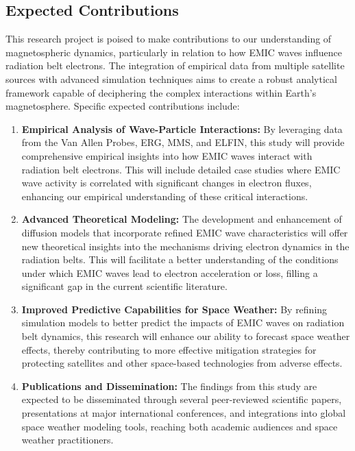 \documentclass[
  letterpaper,
  DIV=11,
  numbers=noendperiod]{scrartcl}
\begin{document}
\subsection{Expected Contributions}\label{expected-contributions}

This research project is poised to make contributions to our understanding of magnetospheric dynamics, particularly in relation to how EMIC waves influence radiation belt electrons. The integration of empirical data from multiple satellite sources with advanced simulation techniques aims to create a robust analytical framework capable of deciphering the complex interactions within Earth's magnetosphere. Specific expected contributions include:

\begin{enumerate}
\def\labelenumi{\arabic{enumi}.}
\item
  \textbf{Empirical Analysis of Wave-Particle Interactions:} By leveraging data from the Van Allen Probes, ERG, MMS, and ELFIN, this study will provide comprehensive empirical insights into how EMIC waves interact with radiation belt electrons. This will include detailed case studies where EMIC wave activity is correlated with significant changes in electron fluxes, enhancing our empirical understanding of these critical interactions.
\item
  \textbf{Advanced Theoretical Modeling:} The development and enhancement of diffusion models that incorporate refined EMIC wave characteristics will offer new theoretical insights into the mechanisms driving electron dynamics in the radiation belts. This will facilitate a better understanding of the conditions under which EMIC waves lead to electron acceleration or loss, filling a significant gap in the current scientific literature.
\item
  \textbf{Improved Predictive Capabilities for Space Weather:} By refining simulation models to better predict the impacts of EMIC waves on radiation belt dynamics, this research will enhance our ability to forecast space weather effects, thereby contributing to more effective mitigation strategies for protecting satellites and other space-based technologies from adverse effects.
\item
  \textbf{Publications and Dissemination:} The findings from this study are expected to be disseminated through several peer-reviewed scientific papers, presentations at major international conferences, and integrations into global space weather modeling tools, reaching both academic audiences and space weather practitioners.
\end{enumerate}
\end{document}
